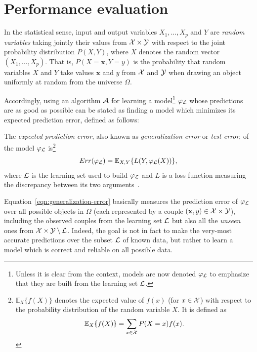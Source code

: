 \section{Performance evaluation}
\label{sec:2:performance-evaluation}

In the statistical sense, input and output variables $X_1, ..., X_p$ and $Y$
are \textit{random variables} taking jointly their values from ${\cal X} \times
{\cal Y}$ with respect to the joint probability distribution $P(X, Y)$\label{ntn:P_XY}, where
$X$\label{ntn:vector-X} denotes the random vector $(X_1, ..., X_p)$. That is, $P(X=\mathbf{x},
Y=y)$ is the probability that random variables $X$ and $Y$ take values
$\mathbf{x}$ and $y$ from ${\cal X}$ and ${\cal Y}$ when drawing an object
uniformly at random from the universe $\Omega$.

Accordingly, using an algorithm ${\cal A}$\label{ntn:A} for learning a model\footnote{Unless
it is clear from the context, models are now denoted $\varphi_{\cal L}$\label{ntn:varphi-L} to
emphasize that they are built from the learning set ${\cal L}$.} $\varphi_{\cal
L}$ whose predictions are as good as possible can be stated as finding a model
which minimizes its expected prediction error, defined as follows:

\begin{definition}
The \emph{expected prediction error}, also known as \emph{generalization
error} or \emph{test error}, of the model $\varphi_{\cal L}$ is\footnote{$\mathbb{E}_X \{f(X)\}$ denotes the expected value of $f(x)$
(for $x \in {\cal X}$) with respect to the probability distribution of the
random variable $X$. It is defined as $$\mathbb{E}_X \{f(X)\} = \sum_{x \in {\cal
X}} P(X=x) f(x).$$}
\begin{equation}\label{eqn:generalization-error}
Err(\varphi_{\cal L}) = \mathbb{E}_{X, Y}\{ L(Y, \varphi_{\cal L}(X)) \},
\end{equation}
where ${\cal L}$ is the learning set used to build $\varphi_{\cal L}$ and $L$\label{ntn:L} is a loss
function measuring the discrepancy between its two
arguments~\citep{geurts:2002}.
\end{definition}

Equation~\ref{eqn:generalization-error} basically measures the prediction error
of $\varphi_{\cal L}$ over all possible objects in $\Omega$ (each represented by a couple
$(\mathbf{x}, y)\in {\cal X}\times{\cal Y}$), including the observed couples
from the learning set ${\cal L}$ but also all the \textit{unseen} ones from
${\cal X}\times{\cal Y} \setminus {\cal L}$. Indeed, the goal is not in fact to
make the very-most accurate predictions over the subset ${\cal L}$ of known
data, but rather to learn a model which is correct and reliable on all possible
data.

